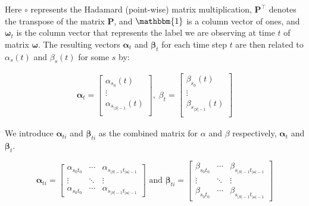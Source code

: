 Here $\circ$ represents the Hadamard (point-wise) matrix multiplication, $\pmb{P}^\top$ denotes the transpose of the matrix $\pmb{P}$, and $\mathbbm{1}$ is a column vector of ones, and $\pmb{\omega}_t$ is the column vector that represents the label we are observing at time $t$ of matrix $\pmb{\omega}$.
The resulting vectors $\pmb{\alpha}_t$ and $\pmb{\beta}_t$ for each time step $t$ are then related to $\alpha_s(t)$ and $\beta_s(t)$ for some $s$ by:

\begin{align}
\pmb{\alpha}
    _t = \begin{bmatrix}
             \alpha_{s_0}(t)       \\
             \vdots                \\
             \alpha_{s_{|S|-1}}(t) \\
    \end{bmatrix}, \;
    {\beta}_t = \begin{bmatrix}
                    \beta_{s_0}(t)       \\
                    \vdots               \\
                    \beta_{s_{|S|-1}}(t) \\
    \end{bmatrix}
\end{align}

We introduce $\pmb{\alpha}_{t i}$ and $\pmb{\beta}_{t i}$ as the combined matrix for $\alpha$ and $\beta$ respectively, $\pmb{\alpha}_t$ and $\pmb{\beta}_t$.

\begin{equation}
    \pmb{\alpha}_{t i} = 
        \begin{bmatrix}
            \alpha_{s_0 t_{0}}  & \cdots & \alpha_{s_{|S|-1}t_{|\textbf{o}|-1}} \\
            \vdots               & \ddots & \vdots                      \\
            \alpha_{s_0 t_{0}}  & \cdots & \alpha_{s_{|S|-1}t_{|\textbf{o}|-1}}
        \end{bmatrix}
        \text{ and }
    \pmb{\beta}_{t i} = 
        \begin{bmatrix}
            \beta_{s_0 t_{0}}  & \cdots & \beta_{s_{|S|-1}t_{|\textbf{o}|-1}} \\
            \vdots               & \ddots & \vdots                      \\
            \beta_{s_0 t_{0}}  & \cdots & \beta_{s_{|S|-1}t_{|\textbf{o}|-1}}
        \end{bmatrix}\label{eq:forward-backward-matrix}
\end{equation}

